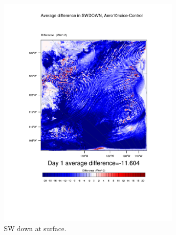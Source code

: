 \begin{figure}
\centering
	\begin{subfigure}{0.48\textwidth}
		\includegraphics[width=\textwidth]{results/aero10ni/diff_Aero10NoIce_SWDOWN_Day1.pdf}
		\caption{SW down at surface.}
		\label{subfig:swdown_r4Day1}
	\end{subfigure}
	\quad
	\begin{subfigure}{0.48\textwidth}
		\centering

\end{subfigure}
\end{figure}
